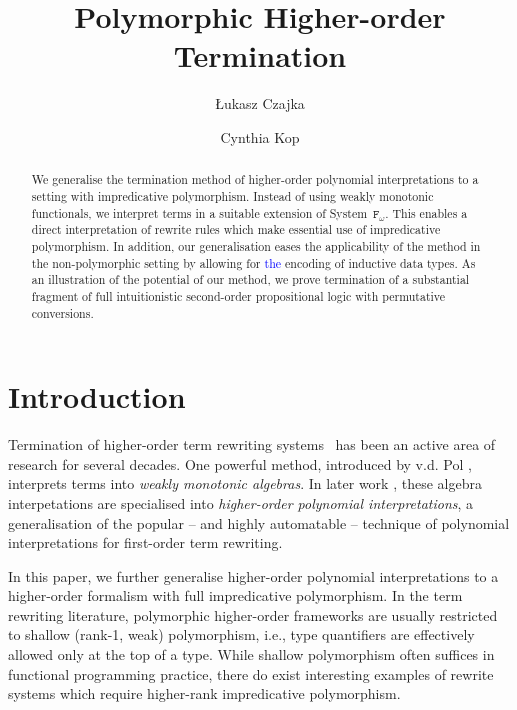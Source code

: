 \documentclass[a4paper,UKenglish,cleveref,autoref,numberwithinsect]{lipics-v2019}
\title{Polymorphic Higher-order Termination}
\author{{\L}ukasz Czajka}{Faculty of Informatics, TU Dortmund, Germany \and \url{http://www.mimuw.edu.pl/~lukaszcz/} }{lukaszcz@mimuw.edu.pl}{https://orcid.org/0000-0001-8083-4280}{}
\author{Cynthia Kop}{Institute of Computer Science, Radboud University Nijmegen, Netherlands \and \url{https://www.cs.ru.nl/~cynthiakop/}}{c.kop@cs.ru.nl}{https://orcid.org/0000-0002-6337-2544}{}
\theoremstyle{definition}
\newcommand{\Fomega}{\mathtt{F}_\omega}
\newcommand{\CKchange}[1]{\textcolor{blue}{#1}}
\begin{document}
\maketitle

\begin{abstract}
  We generalise the termination method of higher-order polynomial
  interpretations to a setting with impredicative
  polymorphism. Instead of using weakly monotonic functionals, we
  interpret terms in a suitable extension of System~$\Fomega$. This
  enables a direct interpretation of rewrite rules which make
  essential use of impredicative polymorphism.  In addition, our
  generalisation eases the applicability of the method in the
  non-polymorphic setting by allowing for \CKchange{the} encoding of inductive data
  types. As an illustration of the potential of our method, we prove
  termination of a substantial fragment of full intuitionistic
  second-order propositional logic with permutative conversions.
\end{abstract}

\section{Introduction}

Termination of higher-order term rewriting
systems~\cite[Chapter~11]{Terese2003} has been an active area of
research for several decades.
One powerful method, introduced by v.d. Pol \cite{Pol1993,pol:96},
interprets terms into \emph{weakly monotonic algebras}.  In later work
\cite{FuhsKop2012,Kop2012}, these algebra interpetations are specialised
into \emph{higher-order polynomial interpretations}, a generalisation of
the popular -- and highly automatable -- technique of polynomial
interpretations for first-order term rewriting.

In this paper, we further generalise higher-order polynomial
interpretations to a higher-order formalism with full impredicative
polymorphism. In the term rewriting literature, polymorphic
higher-order frameworks are usually restricted to shallow (rank-1,
weak) polymorphism, i.e., type quantifiers are effectively allowed
only at the top of a type. While shallow polymorphism often suffices
in functional programming practice, there do exist interesting
examples of rewrite systems which require higher-rank impredicative
polymorphism.
\end{document}
